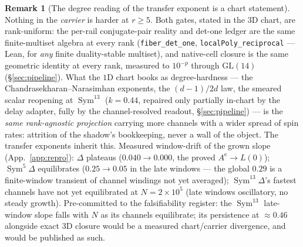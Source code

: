 \documentclass[11pt]{article}
\theoremstyle{definition}
\newtheorem{remark}[theorem]{Remark}
\newcommand{\Sym}{\operatorname{Sym}}
\begin{document}
\begin{remark}[The degree reading of the transfer exponent is a chart statement]\label{rem:chartdegree}
Nothing in the \emph{carrier} is harder at $r\ge5$. Both gates, stated in the $3$D chart, are rank-uniform:
the per-rail conjugate-pair reality and det-one ledger are the same finite-multiset algebra at every rank
(\texttt{fiber\_det\_one}, \texttt{localPoly\_reciprocal} --- Lean, for \emph{any} finite duality-stable
multiset), and native-cell closure is the same geometric identity at every rank, measured to $10^{-p}$
through $\mathrm{GL}(14)$ (\S\ref{sec:pipeline}). What the $1$D chart books as degree-hardness --- the
Chandrasekharan--Narasimhan exponents, the $(d-1)/2d$ law, the smeared scalar reopening at $\Sym^{13}$
($k=0.44$, repaired only partially in-chart by the delay adapter, fully by the channel-resolved readout,
\S\ref{sec:pipeline}) --- is the \emph{same rank-agnostic projection} carrying more channels with a wider
spread of spin rates: attrition of the shadow's bookkeeping, never a wall of the object. The transfer
exponents inherit this. Measured window-drift of the grown slope (App.~\ref{app:repro}): $\Delta$ plateaus
($0.040\to0.000$, the proved $A^{\mathrm e}\to L(0)$); $\Sym^5\Delta$ equilibrates ($0.25\to0.05$ in the
late windows --- the global $0.29$ is a finite-window transient of channel windings not yet averaged);
$\Sym^{13}\Delta$'s fastest channels have not yet equilibrated at $N=2\times10^{5}$ (late windows
oscillatory, no steady growth). Pre-committed to the falsifiability register: the $\Sym^{13}$ late-window slope falls
with $N$ as its channels equilibrate; its persistence at ${\approx}0.46$ alongside exact $3$D closure would
be a measured chart/carrier divergence, and would be published as such.
\end{remark}
\end{document}
